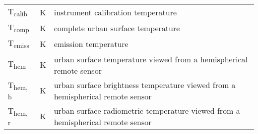 \begin{table}[H]
\begin{tabular}{p{1.5cm}p{3cm}p{10cm}}
		T\textsubscript{calib} & \si{\kelvin} & instrument calibration temperature\\
		T\textsubscript{comp} & \si{\kelvin} & complete urban surface temperature\\
		T\textsubscript{emiss} & \si{\kelvin} & emission temperature\\
		T\textsubscript{hem} & \si{\kelvin} & urban surface temperature viewed from a hemispherical remote sensor\\
		T\textsubscript{hem, b} & \si{\kelvin} & urban surface brightness temperature viewed from a hemispherical remote sensor\\
		T\textsubscript{hem, r} & \si{\kelvin} & urban surface radiometric  temperature viewed from a hemispherical remote sensor\\
		\bottomrule
	\end{tabular} 
\end{table}
